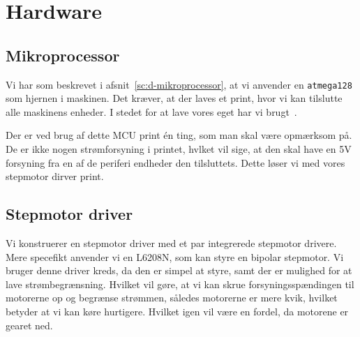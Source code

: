 \chapter[Implementering af hardware]{Hardware}


\section{Mikroprocessor}
\label{sc:i-mcu}
Vi har som beskrevet i afsnit~\vref{sc:d-mikroprocessor}, at vi
anvender en \texttt{atmega128} som hjernen i maskinen. Det kræver, at
der laves et print, hvor vi kan tilslutte alle maskinens enheder. I
stedet for at lave vores eget har vi brugt~\cite{fronter:atmega128}.

Der er ved brug af dette MCU print én ting, som man skal være
opmærksom på. De er ikke nogen strømforsyning i printet, hvlket vil
sige, at den skal have en 5V forsyning fra en af de periferi endheder
den tilsluttets. Dette løser vi med vores stepmotor dirver print.

\section{Stepmotor driver}
\label{sc:stepmotor-driver}


Vi konstruerer en stepmotor driver med et par integrerede stepmotor
drivere. Mere specefikt anvender vi en L6208N, som kan styre en
bipolar stepmotor. Vi bruger denne driver kreds, da den er simpel at
styre, samt der er mulighed for at lave strømbegrænsning. Hvilket vil
gøre, at vi kan skrue forsyningsspændingen til motorerne op og
begrænse strømmen, således motorerne er mere kvik, hvilket betyder at
vi kan køre hurtigere. Hvilket igen vil være en fordel, da motorene er
gearet ned.

